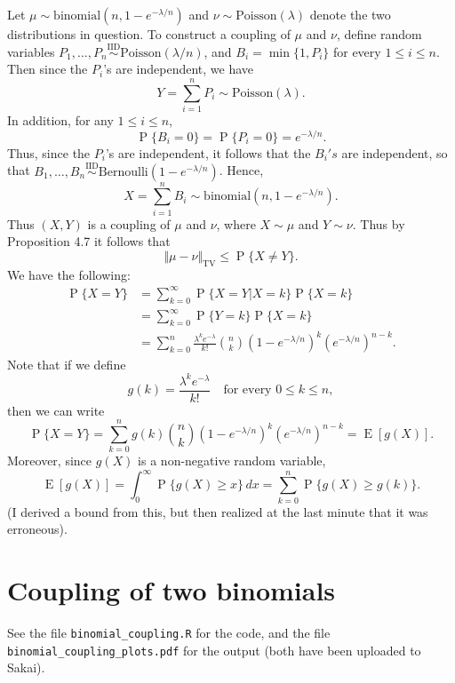 \documentclass[12pt]{article}
\DeclareMathOperator{\E}{E}
\DeclareMathOperator{\Prob}{P}
\begin{document}
Let $\mu \sim \mathrm{binomial}(n, 1 - e^{-\lambda / n})$ and $\nu \sim \mathrm{Poisson}(\lambda)$ denote the two distributions in question. To construct a coupling of $\mu$ and $\nu$, define random variables $P_1, \ldots, P_n \overset{\text{IID}}\sim \mathrm{Poisson}(\lambda / n)$, and $B_i = \min\{1, P_i\}$ for every $1 \leq i \leq n$. Then since the $P_i$'s are independent, we have
\begin{equation*}
Y = \sum_{i=1}^n P_i \sim \mathrm{Poisson}(\lambda).
\end{equation*}
In addition, for any $1 \leq i \leq n$,
\begin{equation*}
\Prob\{B_i = 0\} = \Prob\{P_i = 0\} = e^{-\lambda / n}.
\end{equation*}
Thus, since the $P_i$'s are independent, it follows that the $B_i's$ are independent, so that $B_1, \ldots, B_n \overset{\text{IID}}\sim \mathrm{Bernoulli}(1 - e^{-\lambda / n})$. Hence,
\begin{equation*}
X = \sum_{i=1}^n B_i \sim \mathrm{binomial}(n, 1 - e^{-\lambda / n}).
\end{equation*}
Thus $(X, Y)$ is a coupling of $\mu$ and $\nu$, where $X \sim \mu$ and $Y \sim \nu$. Thus by Proposition 4.7 it follows that
\begin{equation*}
\Vert \mu - \nu \Vert_\mathrm{TV} \leq \Prob\{X \neq Y\}.
\end{equation*}
We have the following:
\begin{align*}
\Prob\{X = Y\} &= \sum_{k=0}^\infty \Prob\{X = Y | X = k\} \Prob\{X = k\} \\
&= \sum_{k=0}^\infty \Prob\{Y = k\} \Prob\{X = k\} \\
&= \sum_{k=0}^n \frac{\lambda^k e^{-\lambda}}{k!} \binom{n}{k}(1 - e^{-\lambda / n})^k (e^{-\lambda / n})^{n-k}.
\end{align*}
Note that if we define
\begin{equation*}
g(k) = \frac{\lambda^k e^{-\lambda}}{k!} \quad \text{for every $0 \leq k \leq n$},
\end{equation*}
then we can write
\begin{equation*}
\Prob\{X = Y\} = \sum_{k=0}^n g(k) \binom{n}{k}(1 - e^{-\lambda / n})^k (e^{-\lambda / n})^{n-k} = \E[g(X)].
\end{equation*}
Moreover, since $g(X)$ is a non-negative random variable,
\begin{equation*}
\E[g(X)] = \int_0^\infty \Prob\{g(X) \geq x\} \, dx = \sum_{k=0}^n \Prob\{g(X) \geq g(k)\}.
\end{equation*}
(I derived a bound from this, but then realized at the last minute that it was erroneous).

\section*{Coupling of two binomials}

See the file \texttt{binomial\_coupling.R} for the code, and the file \texttt{binomial\_coupling\_plots.pdf} for the output (both have been uploaded to Sakai).
\end{document}
